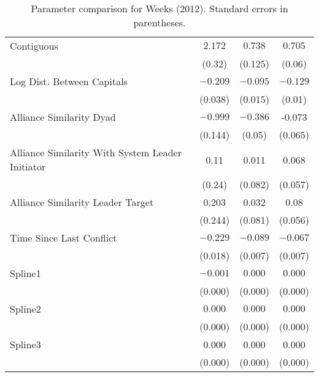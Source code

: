 \begin{table}[ht]
\begin{tabular}{lccc}
  Contiguous & $2.172$ & $0.738$ & $0.705$ \\
   & (0.32) & (0.125) & (0.06) \\ 
  Log Dist. Between Capitals & $-0.209$ & $-0.095$ & $-0.129$ \\
   & (0.038) & (0.015) & (0.01) \\ 
  Alliance Similarity Dyad  & $-0.999$ & $-0.386$ & -0.073 \\
   & (0.144) & (0.05) & (0.065) \\ 
  Alliance Similarity With System Leader Initiator & 0.11 & 0.011 & 0.068 \\ 
   & (0.24) & (0.082) & (0.057) \\ 
  Alliance Similarity Leader Target & 0.203 & 0.032 & 0.08 \\ 
   & (0.244) & (0.081) & (0.056) \\ 
  Time Since Last Conflict & $-0.229$ & $-0.089$ & $-0.067$ \\
   & (0.018) & (0.007) & (0.007) \\ 
  Spline1 & $-0.001$ & $0.000$ & $0.000$ \\
   & (0.000) & (0.000) & (0.000) \\ 
  Spline2 & $0.000$ & $0.000$ & $0.000$ \\
   & (0.000) & (0.000) & (0.000) \\ 
  Spline3 & 0.000 & 0.000 & 0.000 \\ 
   & (0.000) & (0.000) & (0.000) \\ 
   \hline
\hline
\end{tabular}
\endgroup
\caption{Parameter comparison for Weeks (2012). Standard errors in parentheses.} 
\label{tab:weeks_coef}
\end{table}
